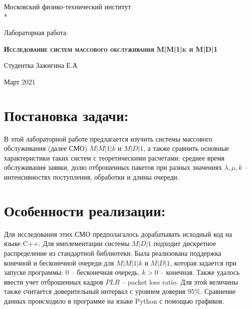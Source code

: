 \documentclass[a4paper,12 pt]{article}
\begin{document}
 \author{Зажигина Елизавета}
\begin{center}
	Московский физико-технический институт \\*
	\hrulefill
\end{center}

\vspace{8em}

\begin{center}
	\Large Лабораторная работа:
\end{center}

\vspace{2.5em}

\begin{center}
	\textsc{\textbf{Исследование систем массового обслуживания M|M|1|k и M|D|1
			\linebreak}}
\end{center}

\vspace{6em}

\begin{flushleft}
	Студентка \hrulefill Зажигина Е.А \\
	
\end{flushleft}

\vspace{\fill}

\begin{center}
	Март 2021
\end{center}
\newpage
\section*{Постановка задачи:}
В этой лабораторной работе предлагается изучить системы массового обслуживания (далее СМО) $M|M|1|k$ и $M|D|1$, а также сравнить основные характеристики таких систем с теоретическими расчетами: среднее время обслуживания заявки, долю отброшенных пакетов при разных значениях $\lambda, \mu, k$ -- интенсивностях поступления, обработки и длины очереди. 

\section*{Особенности реализации:}
Для исследования этих СМО предполагалось дорабатывать исходный код на языке C++. Для имплементации системы $M|D|1$ подходит дискретное распределение из стандартной библиотеки. Была реализована поддержка конечной и бесконечной очереди для $M|M|1|k$ и $M|D|1$, которая задается при запуске программы: $0$ -- бесконечная очередь, $k > 0$ -- конечная. Также удалось ввести учет отброшенных кадров $PLR$ -- packet loss ratio. Для этой величины также считается доверительный интервал с уровнем доверия 95\%. Сравнение данных происходило в программе на языке Python с помощью графиков. 
\end{document}
